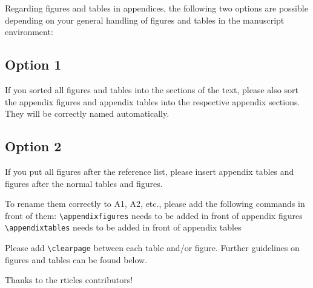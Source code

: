 \documentclass[gmd, manuscript]{copernicus}
\begin{document}
Regarding figures and tables in appendices, the following two options
are possible depending on your general handling of figures and tables in
the manuscript environment:

\subsection{Option 1}

If you sorted all figures and tables into the sections of the text,
please also sort the appendix figures and appendix tables into the
respective appendix sections. They will be correctly named
automatically.

\subsection{Option 2}

If you put all figures after the reference list, please insert appendix
tables and figures after the normal tables and figures.

To rename them correctly to A1, A2, etc., please add the following
commands in front of them: \texttt{\textbackslash{}appendixfigures}
needs to be added in front of appendix figures
\texttt{\textbackslash{}appendixtables} needs to be added in front of
appendix tables

Please add \texttt{\textbackslash{}clearpage} between each table and/or
figure. Further guidelines on figures and tables can be found below.
\noappendix




\begin{acknowledgements}
Thanks to the rticles contributors!
\end{acknowledgements}


\end{document}
